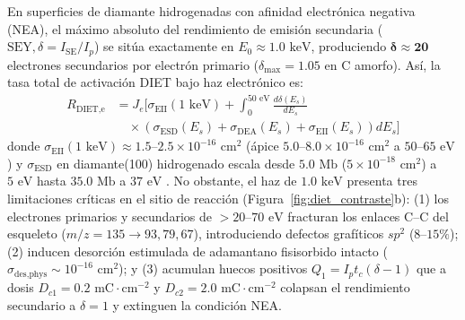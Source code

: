 \documentclass[10pt,twocolumn,a4paper]{article}
\begin{document}
En superficies de diamante hidrogenadas con afinidad electrónica negativa (NEA), el máximo absoluto del rendimiento de emisión secundaria ($\text{SEY}, \delta = I_{\text{SE}}/I_p$) se sitúa exactamente en $E_0 \approx 1.0\text{ keV}$, produciendo $\mathbf{\delta \approx 20}$ electrones secundarios por electrón primario ($\delta_{\text{max}} = 1.05$ en C amorfo). Así, la tasa total de activación DIET bajo haz electrónico es:
\begin{equation}
\begin{split}
R_{\text{DIET,e}} &= J_e \Bigg[ \sigma_{\text{EII}}(1\text{ keV}) + \int_0^{50\text{ eV}} \frac{d\delta(E_s)}{dE_s} \\
&\quad \times \left(\sigma_{\text{ESD}}(E_s) + \sigma_{\text{DEA}}(E_s) + \sigma_{\text{EII}}(E_s)\right) dE_s \Bigg]
\end{split}
\end{equation}
donde $\sigma_{\text{EII}}(1\text{ keV}) \approx 1.5\text{--}2.5 \times 10^{-16}\text{ cm}^2$ (ápice $5.0\text{--}8.0 \times 10^{-16}\text{ cm}^2$ a $50\text{--}65\text{ eV}$) y $\sigma_{\text{ESD}}$ en diamante(100) hidrogenado escala desde $5.0\text{ Mb}$ ($5 \times 10^{-18}\text{ cm}^2$) a $5\text{ eV}$ hasta $35.0\text{ Mb}$ a $37\text{ eV}$ \cite{Hoffman2002}. No obstante, el haz de $1.0\text{ keV}$ presenta tres limitaciones críticas en el sitio de reacción (Figura~\ref{fig:diet_contraste}b): (1) los electrones primarios y secundarios de $>20\text{--}70\text{ eV}$ fracturan los enlaces $\text{C--C}$ del esqueleto ($m/z = 135 \to 93, 79, 67$), introduciendo defectos grafíticos $sp^2$ ($8\text{--}15\%$); (2) inducen desorción estimulada de adamantano fisisorbido intacto ($\sigma_{\text{des,phys}} \sim 10^{-16}\text{ cm}^2$); y (3) acumulan huecos positivos $Q_1 = I_p t_c (\delta - 1)$ que a dosis $D_{c1} = 0.2\text{ mC}\cdot\text{cm}^{-2}$ y $D_{c2} = 2.0\text{ mC}\cdot\text{cm}^{-2}$ colapsan el rendimiento secundario a $\delta = 1$ y extinguen la condición NEA.
\end{document}
